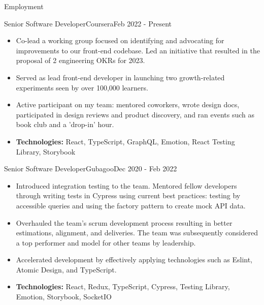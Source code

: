 \documentclass[]{mcdowellcv}
\begin{document}
	\begin{cvsection}{Employment}
	        \begin{cvsubsection}{Senior Software Developer}{Coursera}{Feb 2022 - Present}
	                \begin{itemize}
	                        \item Co-lead a working group focused on identifying and advocating for improvements to our front-end codebase. Led an initiative that resulted in the proposal of 2 engineering OKRs for 2023.
	                        \item Served as lead front-end developer in launching two growth-related experiments seen by over 100,000 learners.
	                        \item Active participant on my team: mentored coworkers, wrote design docs, participated in design reviews and product discovery, and ran events such as book club and a 'drop-in' hour.
	                        \item \textbf{Technologies:} React, TypeScript, GraphQL, Emotion, React Testing Library, Storybook
	                \end{itemize}
	           
	        \end{cvsubsection}
	        
		\begin{cvsubsection}{Senior Software Developer}{Gubagoo}{Dec 2020 - Feb 2022}
 			\begin{itemize}
 			    \item Introduced integration testing to the team. Mentored fellow developers through writing tests in Cypress using current best practices: testing by accessible queries and using the factory pattern to create mock API data.
				\item Overhauled the team's scrum development process resulting in better estimations, alignment, and deliveries. The team was subsequently considered a top performer and model for other teams by leadership.
				\item Accelerated development by effectively applying technologies such as Eslint, Atomic Design, and TypeScript.
				\item \textbf{Technologies:} React, Redux, TypeScript, Cypress, Testing Library, Emotion, Storybook, SocketIO
			\end{itemize}
		\end{cvsubsection}
		

\end{cvsection}
\end{document}
